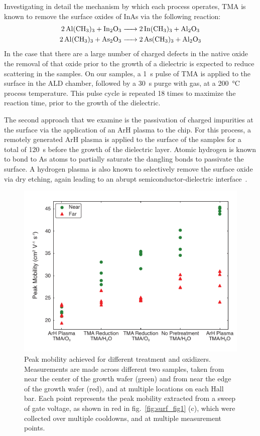 Investigating in detail the mechanism by which each process operates, TMA is known to remove the surface oxides of InAs via the following reaction\cite{iiiv_cleanup}:
\begin{align}
    \ce{2Al(CH3)3 + In2O3 &-> 2In(CH3)3 + Al2O3} \\
    \ce{2Al(CH3)3 + As2O3 &-> 2As(CH3)3 + Al2O3}
\end{align}
In the case that there are a large number of charged defects in the native oxide the removal of that oxide prior to the growth of a  dielectric is expected to reduce scattering in the samples. On our samples, a \SI{1}{\second} pulse of TMA is applied to the surface in the ALD chamber, followed by a \SI{30}{\second} purge with  gas, at a \SI{200}{\celsius} process temperature. This pulse cycle is repeated 18 times to maximize the reaction time, prior to the growth of the dielectric.

The second approach that we examine is the passivation of charged impurities at the surface via the application of an ArH plasma to the chip\cite{CLEVELAND2013167,BELL1998125,doi:10.1116/1.586538}. For this process, a remotely generated ArH plasma is applied to the surface of the samples for a total of \SI{120}{\second} before the growth of the dielectric layer. Atomic hydrogen is known to bond to As atoms to partially saturate the dangling bonds to passivate the surface. A hydrogen plasma is also known to selectively remove the surface oxide via dry etching, again leading to an abrupt semiconductor-dielectric interface~\cite{doi:10.1063/1.92194,doi:10.1063/1.100961}.

\begin{figure}
\includegraphics[width=0.6\linewidth]{Figure3}
\caption{\label{fig:surf_fig3} Peak mobility achieved for different treatment and oxidizers. Measurements are made across different two samples, taken from near the center of the growth wafer (green) and from near the edge of the growth wafer (red), and at multiple locations on each Hall bar. Each point represents the peak mobility extracted from a sweep of gate voltage, as shown in red in fig.~\ref{fig:surf_fig1} (c), which were collected over multiple cooldowns, and at multiple measurement points.}
\end{figure}

